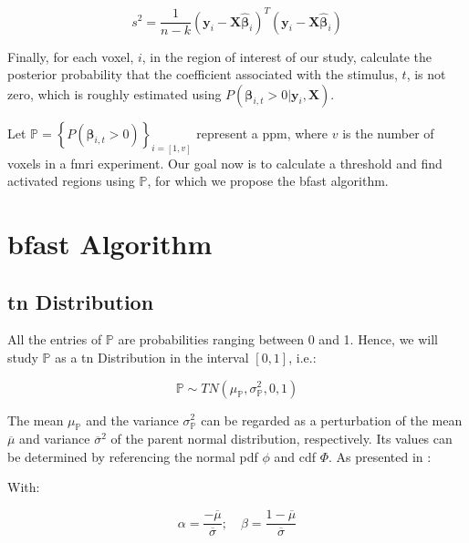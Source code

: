 \begin{equation}
s^2 = \frac{1}{n-k} \left( \bm{y}_i - \bm{X}\bm{\hat{\beta}}_i \right)^T \left( \bm{y}_i - \bm{X}\bm{\hat{\beta}}_i \right)
\end{equation}

Finally, for each voxel, $i$, in the region of interest of our study, calculate the posterior probability that the coefficient associated with the stimulus, $t$, is not zero, which is roughly estimated using $P(\bm{\beta}_{i,t} > 0 | \bm{y}_i, \bm{X})$.

Let $\bm{\mathbb{P}} = \left\{ P(\bm{\beta}_{i,t} > 0 ) \right\}_{i=[1,v]}$ represent a \gls{ppm}, where $v$ is the number of voxels in a \gls{fmri} experiment. Our goal now is to calculate a threshold and find activated regions using $\bm{\mathbb{P}}$, for which we propose the \gls{bfast} algorithm.

\section{\texorpdfstring{\gls{bfast}}{BFAST} Algorithm}

\subsection{\texorpdfstring{\gls{tn}}{TN} Distribution}

All the entries of $\bm{\mathbb{P}}$ are probabilities ranging between 0 and 1. Hence, we will study $\bm{\mathbb{P}}$ as a \gls{tn} Distribution in the interval $[0,1]$, i.e.:

\begin{equation}
\bm{\mathbb{P}} \sim TN\left( \mu_{\bm{\mathbb{P}}}, \sigma^2_{\bm{\mathbb{P}}}, 0,1 \right)
\end{equation}

The mean $\mu_{\bm{\mathbb{P}}}$ and the variance $\sigma^2_{\bm{\mathbb{P}}}$ can be regarded as a perturbation of the mean $\overline{\mu}$ and variance $\overline{\sigma}^2$ of the parent normal distribution, respectively. Its values can be determined by referencing the normal \gls{pdf} $\phi$ and \gls{cdf} $\Phi$. As presented in \cite{johnson1995continuous}:

With:

\begin{equation}
\alpha = \frac{-\overline{\mu}}{\overline{\sigma}}; \quad \beta = \frac{1-\overline{\mu}}{\overline{\sigma}}
\label{eq:alpha_beta}
\end{equation}

